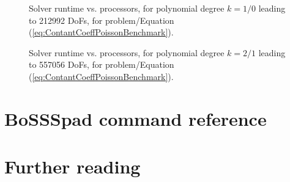 \documentclass[a4paper,10pt]{report} %
\begin{document}
\graphicspath{{./apdx-MPISolverPerformance/strongScaling/NSESphere/plots/}}

\begin{figure}[h!]
	\begin{center}
		
	\end{center}
	\caption{
		Solver runtime vs. processors, for polynomial degree $k=1/0$ leading to 212992 DoFs,
		for problem/Equation (\ref{eq:ContantCoeffPoissonBenchmark}).
	}
	\label{fig:Spherek1Time}
\end{figure}

\graphicspath{{./apdx-MPISolverPerformance/strongScaling/NSESphereComplex/plots/}}

\begin{figure}[h!]
	\begin{center}
		
	\end{center}
	\caption{
		Solver runtime vs. processors, for polynomial degree $k=2/1$ leading to 557056 DoFs,
		for problem/Equation (\ref{eq:ContantCoeffPoissonBenchmark}).
	}
	\label{fig:Spherek1Time}
\end{figure}

\chapter{BoSSSpad command reference}
\label{sec:BoSSSpadReference}

\renewcommand{\ttdefault}{pcr} %




\chapter{Further reading}

\printbibliography[heading=subbibliography,title={Bibliography}]
\end{document}
